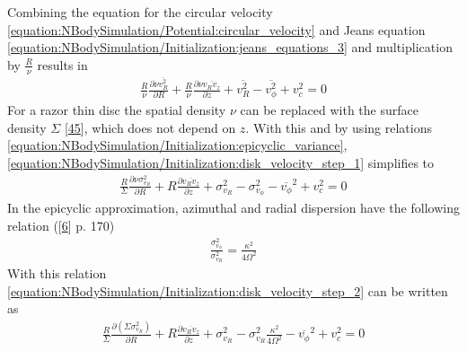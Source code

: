 \documentclass[letterpaper,10pt,english]{sphinxmanual}
\begin{document}
\sphinxAtStartPar
Combining the equation for the circular velocity \eqref{equation:NBodySimulation/Potential:circular_velocity} and Jeans equation \eqref{equation:NBodySimulation/Initialization:jeans_equations_3} and multiplication by \(\frac{R}{\nu}\) results in
\begin{equation}\label{equation:NBodySimulation/Initialization:disk_velocity_step_1}
\begin{split}\frac{R}{\nu} \frac{\partial \nu \overline{v_R^2}}{\partial R}
+ \frac{R}{\nu} \frac{\partial \nu \overline{v_Rv_z}}{\partial z}
+ \overline{v_R^2}-\overline{v_\phi^2} + v_c^2 = 0\end{split}
\end{equation}
\sphinxAtStartPar
For a razor thin disc the spatial density \(\nu\) can be replaced with the surface density \(\Sigma\) {[}\hyperlink{cite.NBodySimulation/Appendix:id19}{45}{]},
which does not depend on \(z\). With this and by using relations \eqref{equation:NBodySimulation/Initialization:epicyclic_variance}, \eqref{equation:NBodySimulation/Initialization:disk_velocity_step_1} simplifies to
\begin{equation}\label{equation:NBodySimulation/Initialization:disk_velocity_step_2}
\begin{split}\frac{R}{\Sigma} \frac{\partial \nu \sigma_{v_{R}}^2}{\partial R}
+ R \frac{\partial \overline{v_Rv_z}}{\partial z}
+ \sigma_{v_{R}}^2 -\sigma_{v_{\phi}}^2  - \overline{v_\phi}^2 + v_c^2 = 0\end{split}
\end{equation}
\sphinxAtStartPar
In the epicyclic approximation, azimuthal and radial dispersion have the following relation ({[}\hyperlink{cite.NBodySimulation/Appendix:id17}{6}{]} p. 170)
\begin{equation}\label{equation:NBodySimulation/Initialization:azimuthal_velocity_dispersion}
\begin{split}\frac{\sigma_{v_{\phi}}^2}{\sigma_{v_{R}}^2} = \frac{\kappa^2}{4\Omega^2}\end{split}
\end{equation}
\sphinxAtStartPar
With this relation \eqref{equation:NBodySimulation/Initialization:disk_velocity_step_2} can be written as
\begin{equation*}
\begin{split}\frac{R}{\Sigma} \frac{\partial  \left ( \Sigma \sigma_{v_{R}}^2 \right ) }{\partial R}
+ R \frac{\partial \overline{v_Rv_z}}{\partial z}
+ \sigma_{v_{R}}^2
- \sigma_{v_{R}}^2 \frac{\kappa^2}{4\Omega^2}
- \overline{v_\phi}^2 + v_c^2 = 0\end{split}
\end{equation*}
\end{document}
